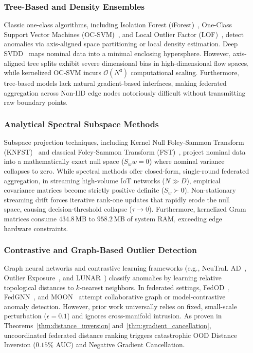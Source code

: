 \subsubsection{Tree-Based and Density Ensembles}
Classic one-class algorithms, including Isolation Forest (iForest)~\cite{liu2008isolation}, One-Class Support Vector Machines (OC-SVM)~\cite{scholkopf2001estimating}, and Local Outlier Factor (LOF)~\cite{breunig2000lof}, detect anomalies via axis-aligned space partitioning or local density estimation. Deep SVDD~\cite{ruff2018deep} maps nominal data into a minimal enclosing hypersphere. However, axis-aligned tree splits exhibit severe dimensional bias in high-dimensional flow spaces, while kernelized OC-SVM incurs $\mathcal{O}(N^3)$ computational scaling. Furthermore, tree-based models lack natural gradient-based interfaces, making federated aggregation across Non-IID edge nodes notoriously difficult without transmitting raw boundary points.

\subsubsection{Analytical Spectral Subspace Methods}
Subspace projection techniques, including Kernel Null Foley-Sammon Transform (KNFST)~\cite{bodesheim2013kernel} and classical Foley-Sammon Transform (FST)~\cite{foley1975optimal}, project nominal data into a mathematically exact null space ($S_w w = 0$) where nominal variance collapses to zero. While spectral methods offer closed-form, single-round federated aggregation, in streaming high-volume IoT networks ($N \gg D$), empirical covariance matrices become strictly positive definite ($S_w \succ 0$). Non-stationary streaming drift forces iterative rank-one updates that rapidly erode the null space, causing decision-threshold collapse ($\tau \to 0$). Furthermore, kernelized Gram matrices consume $434.8$\,MB to $958.2$\,MB of system RAM, exceeding edge hardware constraints.

\subsubsection{Contrastive and Graph-Based Outlier Detection}
Graph neural networks and contrastive learning frameworks (e.g., NeuTraL AD~\cite{qiu2021neural}, Outlier Exposure~\cite{hendrycks2019deep}, and LUNAR~\cite{goodge2022lunar}) classify anomalies by learning relative topological distances to $k$-nearest neighbors. In federated settings, FedOD~\cite{wang2022fedod}, FedGNN~\cite{wu2021federated}, and MOON~\cite{li2021model} attempt collaborative graph or model-contrastive anomaly detection. However, prior work universally relies on fixed, small-scale perturbation ($\epsilon = 0.1$) and ignores cross-manifold intrusion. As proven in Theorems~\ref{thm:distance_inversion} and~\ref{thm:gradient_cancellation}, uncoordinated federated distance ranking triggers catastrophic OOD Distance Inversion ($0.15\%$ AUC) and Negative Gradient Cancellation.

